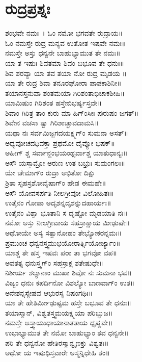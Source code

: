 \section{ರುದ್ರಪ್ರಶ್ನಃ}
ಶಂಭವೇ ನಮಃ~। ಓಂ ನಮೋ ಭಗವತೇ ರುದ್ರಾಯ॥\\
ಓಂ ನಮಸ್ತೇ ರುದ್ರ ಮನ್ಯವ ಉತೋತ ಇಷವೇ ನಮಃ॥\\
ನಮಸ್ತೇ ಅಸ್ತು ಧನ್ವನೇ ಬಾಹುಭ್ಯಾಮುತ ತೇ ನಮಃ॥\\
ಯಾ ತ ಇಷುಃ ಶಿವತಮಾ ಶಿವಂ ಬಭೂವ ತೇ ಧನುಃ॥\\
ಶಿವ ಶರವ್ಯಾ ಯಾ ತವ ತಯಾ ನೋ ರುದ್ರ ಮೃಡಯ ॥\\
ಯಾ ತೇ ರುದ್ರ ಶಿವಾ ತನೂರಘೋರಾ ಪಾಪಕಾಶಿನೀ॥\\
ತಯಾನಸ್ತನುವಾ ಶಂತಮಯಾ ಗಿರಿಶಂತಾಭಿಚಾಕಶೀಹಿ॥\\
ಯಾಮಿಷುಂ ಗಿರಿಶಂತ ಹಸ್ತೇಬಿಭರ್ಷ್ಯಸ್ತವೇ॥\\
ಶಿವಾಂ ಗಿರಿತ್ರ ತಾಂ ಕುರು ಮಾ ಹಿಗ್ಂಸೀಃ ಪುರುಷಂ ಜಗತ್॥\\
ಶಿವೇನ ವಚಸಾ ತ್ವಾ ಗಿರಿಶಾಚ್ಛಾವದಾಮಸಿ॥\\
ಯಥಾ ನಃ ಸರ್ವಮಿಜ್ಜಗದಯಕ್ಷ್ಮಗ್ಂ ಸುಮನಾ ಅಸತ್॥\\
ಅಧ್ಯವೋಚದಧಿವಕ್ತಾ  ಪ್ರಥಮೋ ದೈವ್ಯೋ ಭಿಷಕ್॥\\
ಅಹೀಗ್ ಶ್ಚ  ಸರ್ವಾನ್ಜಂಭಯಂಥ್ಸರ್ವಾಶ್ಚ ಯಾತುಧಾನ್ಯಃ॥\\
ಅಸೌ ಯಸ್ತಾಮ್ರೋ ಅರುಣ ಉತ ಬಭ್ರುಃ ಸುಮಂಗಲಃ॥\\
ಯೇ ಚೇಮಾಗ್ಂ ರುದ್ರಾ ಅಭಿತೋ ದಿಕ್ಷು\\ ಶ್ರಿತಾ ಸ್ಸಹಸ್ರಶೋವೈಷಾಗ್ಂ ಹೇಡ ಈಮಹೇ॥\\
ಅಸೌ ಯೋವಸರ್ಪತಿ ನೀಲಗ್ರೀವೋ ವಿಲೋಹಿತಃ॥\\
ಉತೈನಂ ಗೋಪಾ ಅದೃಶನ್ನದೃಶನ್ನುದಹಾರ್ಯಃ॥\\
ಉತೈನಂ ವಿಶ್ವಾ  ಭೂತಾನಿ ಸ ದೃಷ್ಟೋ ಮೃಡಯಾತಿ ನಃ॥\\
ನಮೋ ಅಸ್ತು ನೀಲಗ್ರೀವಾಯ ಸಹಸ್ರಾಕ್ಷಾಯ ಮೀಢುಷೇ॥\\
ಅಥೋಯೇ ಅಸ್ಯ ಸತ್ವಾನೋಹಂ ತೇಭ್ಯೋಕರನ್ನಮಃ॥\\
ಪ್ರಮುಂಚ ಧನ್ವನಸ್ತ್ವಮುಭಯೋರಾರ್ತ್ನಿಯೋರ್ಜ್ಯಾಂ॥\\
ಯಾಶ್ಚ ತೇ ಹಸ್ತ ಇಷವಃ ಪರಾ ತಾ ಭಗವೋ ವಪ॥\\
ಅವತತ್ಯ ಧನುಸ್ತ್ವಗ್ಂ ಸಹಸ್ರಾಕ್ಷ ಶತೇಷುಧೇ॥\\
ನಿಶೀರ್ಯ ಶಲ್ಯಾನಾಂ ಮುಖಾ ಶಿವೋ ನಃ ಸುಮನಾ ಭವ॥\\
ವಿಜ್ಯಂ ಧನುಃ ಕಪರ್ದಿನೋ ವಿಶಲ್ಯೋ ಬಾಣವಾಗ್ಂ ಉತ॥\\
ಅನೇಶನ್ನಸ್ಯೇಷವ ಆಭುರಸ್ಯ ನಿಷಂಗಥಿಃ॥\\
ಯಾ ತೇ ಹೇತಿರ್ಮೀಢುಷ್ಟಮ ಹಸ್ತೇ ಬಭೂವ ತೇ ಧನುಃ॥\\
ತಯಾಸ್ಮಾನ್, ವಿಶ್ವತಸ್ತ್ವಮಯಕ್ಷ್ಮಯಾ ಪರಿಬ್ಭುಜ॥\\
ನಮಸ್ತೇ ಅಸ್ತ್ವಾಯುಧಾಯಾನಾತತಾಯ ಧೃಷ್ಣವೇ॥\\
ಉಭಾಭ್ಯಾಮುತ ತೇ ನಮೋ ಬಾಹುಭ್ಯಾಂ ತವ ಧನ್ವನೇ॥\\
ಪರಿ ತೇ ಧನ್ವನೋ ಹೇತಿರಸ್ಮಾನ್ವೃಣಕ್ತು ವಿಶ್ವತಃ॥\\
ಅಥೋ ಯ ಇಷುಧಿಸ್ತವಾರೇ ಅಸ್ಮನ್ನಿಧೇಹಿ ತಂ॥


